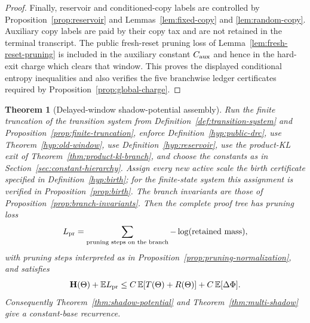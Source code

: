 \documentclass[11pt]{article}
\newtheorem{theorem}{Theorem}[section]
\newcommand{\EE}{\mathbb E}
\newcommand{\bfH}{\mathbf H}
\begin{document}
\begin{proof}
Finally, reservoir and conditioned-copy labels are controlled by
Proposition~\ref{prop:reservoir} and Lemmas~\ref{lem:fixed-copy} and
\ref{lem:random-copy}.  Auxiliary copy labels are paid by their copy tax and
are not retained in the terminal transcript.  The public fresh-reset pruning
loss of Lemma~\ref{lem:fresh-reset-pruning} is included in the auxiliary
constant $C_{\rm aux}$ and hence in the hard-exit charge which clears that
window.  This proves the displayed
conditional entropy inequalities and also verifies the five branchwise ledger
certificates required by Proposition~\ref{prop:global-charge}.
\end{proof}

\begin{theorem}[Delayed-window shadow-potential assembly]
\label{thm:assembly}
Run the finite truncation of the transition system from
Definition~\ref{def:transition-system} and Proposition~\ref{prop:finite-truncation},
enforce Definition~\ref{hyp:public-drc}, use Theorem~\ref{hyp:old-window},
use Definition~\ref{hyp:reservoir}, use the product-KL exit of
Theorem~\ref{thm:product-kl-branch}, and choose the constants as in
Section~\ref{sec:constant-hierarchy}.  Assign every new active scale the birth
certificate specified in Definition~\ref{hyp:birth}; for the finite-state
system this assignment is verified in Proposition~\ref{prop:birth}.  The
branch invariants are those of Proposition~\ref{prop:branch-invariants}.
Then
the complete proof tree has pruning loss
\[
  L_{\rm pr}
  =
  \sum_{\textup{pruning steps on the branch}} -\log(\textup{retained mass}),
\]
with pruning steps interpreted as in
Proposition~\ref{prop:pruning-normalization}, and satisfies
\[
  \bfH(\Theta)+\EE L_{\rm pr}
  \le
  C\,\EE[T(\Theta)+R(\Theta)]
  + C\,\EE[\Delta\Phi].
\]
Consequently Theorem~\ref{thm:shadow-potential} and
Theorem~\ref{thm:multi-shadow} give a constant-base recurrence.
\end{theorem}
\end{document}
